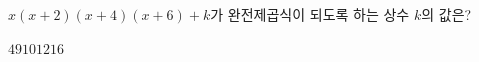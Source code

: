 $x(x+2)(x+4)(x+6)+k$가 완전제곱식이 되도록 하는 상수 $k$의 값은?
\begin{choices32}{$4$}{$9$}{$10$}{$12$}{$16$}\end{choices32}
